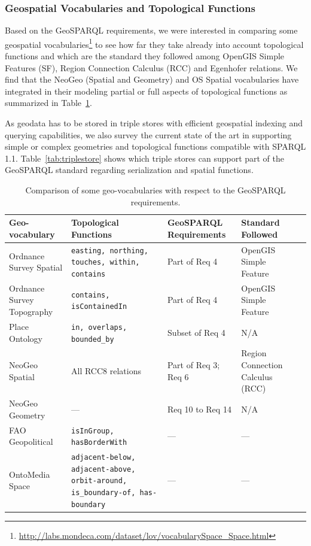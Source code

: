 \subsubsection{Geospatial Vocabularies and Topological Functions}
\label{sec:topofunc}

Based on the GeoSPARQL requirements, we were interested in comparing some geospatial vocabularies\footnote{\url{http://labs.mondeca.com/dataset/lov/vocabularySpace_Space.html}} to see how far they take already into account topological functions and which are the standard they followed among OpenGIS Simple Features (SF), Region Connection Calculus (RCC) and Egenhofer relations. We find that the NeoGeo (Spatial and Geometry) and OS Spatial vocabularies have integrated in their modeling partial or full aspects of topological functions as summarized in Table~\ref{tab:geosparql}.

As geodata has to be stored in triple stores with efficient geospatial indexing and querying capabilities, we also survey the current state of the art  in supporting simple or complex geometries and topological functions compatible with SPARQL 1.1. Table~\ref{tab:triplestore} shows which triple stores can support part of the GeoSPARQL standard regarding serialization and spatial functions.
\begin{table}
\begin{tabularx}{\textwidth}{|X|X|X|X|l}
\hline
\textbf{Geo-vocabulary} & \textbf{Topological Functions} & \textbf{GeoSPARQL Requirements} & \textbf{Standard Followed}\\
\hline
Ordnance Survey Spatial & \texttt{easting, northing, touches, within, contains} & Part of Req 4 & OpenGIS Simple Feature\\ \hline
Ordnance Survey Topography & \texttt{contains, isContainedIn} & Part of Req 4 & OpenGIS Simple Feature\\ \hline
Place Ontology & \texttt{in, overlaps, bounded\_by} & Subset of Req 4 & N/A\\
\hline
NeoGeo Spatial & All RCC8 relations & Part of Req 3; Req 6 & Region Connection Calculus (RCC)\\
\hline
NeoGeo Geometry & --- & Req 10 to Req 14 & N/A\\
\hline
FAO Geopolitical & \texttt{isInGroup, hasBorderWith} & --- & ---\\
\hline
OntoMedia Space & \texttt{adjacent-below, adjacent-above, orbit-around, is\_boundary-of, has-boundary} & --- & ---\\
\hline
\end{tabularx}
\caption{Comparison of some geo-vocabularies with respect to the GeoSPARQL requirements.}
\label{tab:geosparql}
\end{table}

